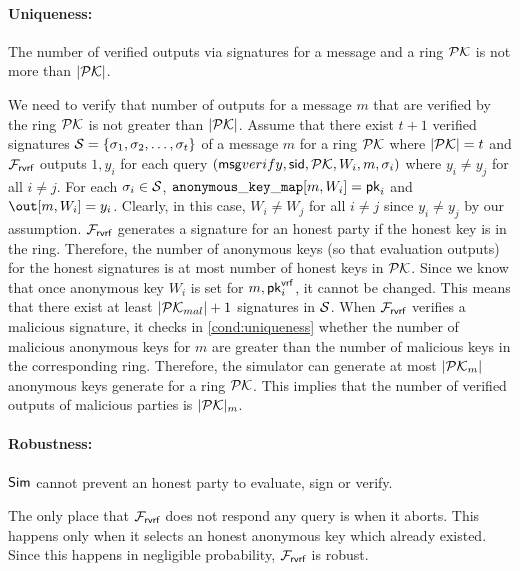 \paragraph{Uniqueness:} The number of verified outputs via signatures for a message and a ring $ {\mathcal{PK}} $ is not more than $ |{\mathcal{PK}}| $.
 
 We need to verify that number of outputs for a message $ m $ that are verified by the ring $ {\mathcal{PK}} $ is not greater than $ |{\mathcal{PK}}| $.
Assume that there exist $ t + 1 $ verified signatures $ {\mathcal{S}} = \{\sigma_1, \sigma_2, \ldots, \sigma_t\} $ of a message $ m $ for a ring $ {\mathcal{PK}} $ where $ |{\mathcal{PK}}| = t $ and $ \mathcal{F}_{\textsf{rvrf}} $ outputs $ 1, y_i $ for each query $ (\mathsf{msg}{verify}, \textsf{sid}, {\mathcal{PK}}, W_i, m, \sigma_i) $ where $ y_i \neq y_j $ for all $ i \neq j $. For each $ \sigma_i \in {\ensuremath{\mathcal{S}}} $, $ \mathtt{anonymous\_key\_map}[m,W_i] = \mathsf{pk}_i $ and $ \out[m,W_i] = y_i $. Clearly, in this case, $ W_i \neq W_j $ for all $ i \neq j $ since $ y_i \neq y_j $ by our assumption. $ \mathcal{F}_{\textsf{rvrf}} $ generates a signature for an honest party if the honest key is in the ring. Therefore, the number of anonymous keys (so that evaluation outputs) for the honest signatures is at most number of honest keys in $ {\mathcal{PK}} $. Since we know that once anonymous key $ W_i $ is set for $ m, \mathsf{pk}^{\mathsf{vrf}}_i $, it cannot be changed. This means that there exist at least $ |{\mathcal{PK}}_{mal}| + 1 $ signatures in $ {\mathcal{S}} $. When $ \mathcal{F}_{\textsf{rvrf}} $ verifies a malicious signature, it checks in \ref{cond:uniqueness} whether the number of malicious anonymous keys for $ m $ are greater than the number of malicious keys in the corresponding ring. Therefore, the simulator can generate at most $ |{\mathcal{PK}}_m| $ anonymous keys generate for a ring $ {\mathcal{PK}} $. This implies that the number of verified outputs of malicious parties   is $ |{\mathcal{PK}}|_m $. 

\paragraph{Robustness:} $ \mathsf{Sim} $ cannot prevent an honest party to evaluate, sign or verify.

The only place that $ \mathcal{F}_{\textsf{rvrf}} $ does not respond any query is when it aborts. This happens only when it selects an honest anonymous key which already existed. Since this happens in negligible probability,  $ \mathcal{F}_{\textsf{rvrf}} $ is robust.

